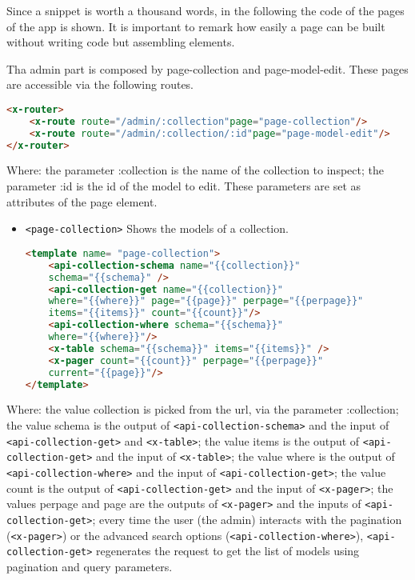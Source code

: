 Since a snippet is worth a thousand words, in the following the code of the pages of the app is shown. It is important to remark how easily a page can be built without writing code but assembling elements.

Tha admin part is composed by page-collection and page-model-edit. These pages are accessible via the following routes.

\begin{lstlisting}[language=html]
<x-router>
	<x-route route="/admin/:collection"page="page-collection"/>
	<x-route route="/admin/:collection/:id"page="page-model-edit"/>
</x-router>
\end{lstlisting}

Where: the parameter :collection is the name of the collection to inspect; the parameter :id is the id of the model to edit. These parameters are set as attributes of the page element.

\begin{itemize} \item \texttt{<page-collection>} Shows the models of a collection.
\begin{lstlisting}[language=html]
<template name= "page-collection">
	<api-collection-schema name="{{collection}}" 
	schema="{{schema}" />
	<api-collection-get name="{{collection}}" 
	where="{{where}}" page="{{page}}" perpage="{{perpage}}"
	items="{{items}}" count="{{count}}"/>
	<api-collection-where schema="{{schema}}" 
	where="{{where}}"/>
	<x-table schema="{{schema}}" items="{{items}}" />
	<x-pager count="{{count}}" perpage="{{perpage}}" 
	current="{{page}}"/>
</template>
\end{lstlisting}
\end{itemize}

Where: the value collection is picked from the url, via the parameter :collection; the value schema is the output of \texttt{<api-collection-schema>} and the input of \texttt{<api-collection-get>} and \texttt{<x-table>}; the value items is the output of \texttt{<api-collection-get>} and the input of \texttt{<x-table>}; the value where is the output of \texttt{<api-collection-where>} and the input of \texttt{<api-collection-get>}; the value count is the output of \texttt{<api-collection-get>} and the input of \texttt{<x-pager>}; the values perpage and page are the outputs of \texttt{<x-pager>} and the inputs of \texttt{<api-collection-get>}; every time the user (the admin) interacts with the pagination (\texttt{<x-pager>}) or the advanced search options (\texttt{<api-collection-where>}), \texttt{<api-collection-get>} regenerates the request to get the list of models using pagination and query parameters.


